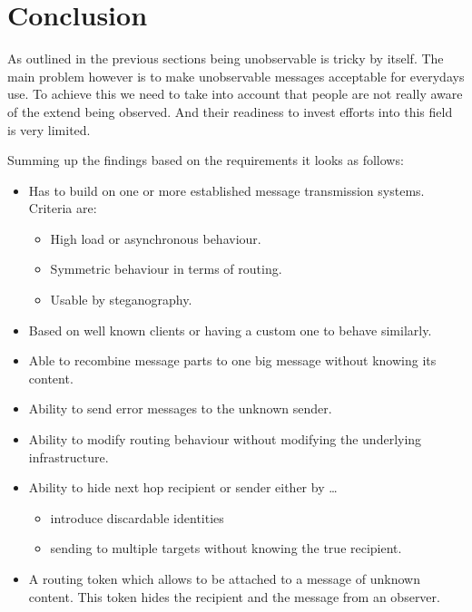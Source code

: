 \documentclass[12pt,journal,compsoc,peerreview]{IEEEtran}
\begin{document}
\section{Conclusion}
As outlined in the previous sections being unobservable is tricky by itself. The main problem however is to make unobservable messages acceptable for everydays use. To achieve this we need to take into account that people are not really aware of the extend being observed. And their readiness to invest efforts into this field is very limited. 
\par
Summing up the findings based on the requirements it looks as follows:
\begin{itemize}
	\item Has to build on one or more established message transmission systems. Criteria are:
	\begin{itemize}
		\item High load or asynchronous behaviour.
		\item Symmetric behaviour in terms of routing.
		\item Usable by steganography.
	\end{itemize} 
	\item Based on well known clients or having a custom one to behave similarly.
	\item Able to recombine message parts to one big message without knowing its content.
	\item Ability to send error messages to the unknown sender.
	\item Ability to modify routing behaviour without modifying the underlying infrastructure.
	\item Ability to hide next hop recipient or sender either by \ldots
	\begin{itemize}
		\item introduce discardable identities
		\item sending to multiple targets without knowing the true recipient.
	\end{itemize}
	\item A routing token which allows to be attached to a message of unknown content. This token hides the recipient and the message from an observer.
\end{itemize}







\end{document}
